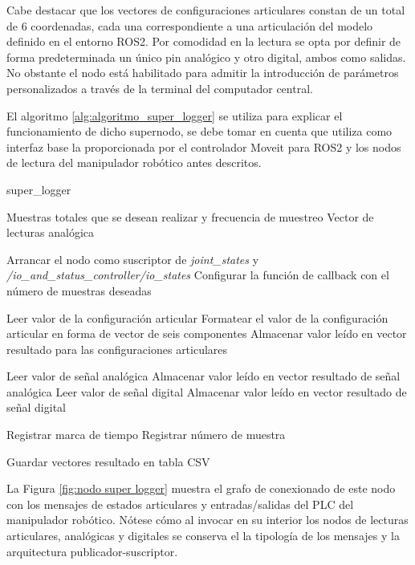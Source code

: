 Cabe destacar que los vectores de configuraciones articulares constan de un total de 6 coordenadas, cada una correspondiente a una articulación del modelo definido en el entorno ROS2. Por comodidad en la lectura se opta por definir de forma predeterminada un único pin analógico y otro digital, ambos como salidas. No obstante el nodo está habilitado para admitir la introducción de parámetros personalizados a través de la terminal del computador central.

El algoritmo \ref{alg:algoritmo_super_logger} se utiliza para explicar el funcionamiento de dicho supernodo, se debe tomar en cuenta que utiliza como interfaz base la proporcionada por el controlador Moveit para ROS2 y los nodos de lectura del manipulador robótico antes descritos.

\begin{algorithm}[h!]
\caption{super\_logger}\label{alg:algoritmo_super_logger}
\begin{algorithmic}[1]
\Require Muestras totales que se desean realizar y frecuencia de muestreo
\Ensure Vector de lecturas analógica

\State Arrancar el nodo como suscriptor de \textit{joint\_states} y \textit{/io\_and\_status\_controller/io\_states}
\State Configurar la función de callback con el número de muestras deseadas

    \State Leer valor de la configuración articular
    \State Formatear el valor de la configuración articular en forma de vector de seis componentes
    \State Almacenar valor leído en vector resultado para las configuraciones articulares

    \State Leer valor de señal analógica
    \State Almacenar valor leído en vector resultado de señal analógica
    \State Leer valor de señal digital
    \State Almacenar valor leído en vector resultado de señal digital

    \State Registrar marca de tiempo
    \State Registrar número de muestra
    
\EndWhile

\State Guardar vectores resultado en tabla CSV
\end{algorithmic}
\end{algorithm}

La Figura \ref{fig:nodo super logger} muestra el grafo de conexionado de este nodo con los mensajes de estados articulares y entradas/salidas del \acrshort{PLC} del manipulador robótico. Nótese cómo al invocar en su interior los nodos de lecturas articulares, analógicas y digitales se conserva el la tipología de los mensajes y la arquitectura publicador-suscriptor.

